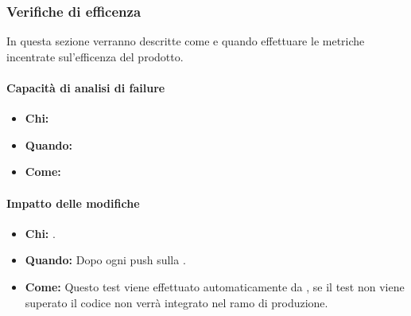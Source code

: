\newpage
\subsubsection{Verifiche di efficenza}
In questa sezione verranno descritte come e quando effettuare le metriche incentrate sul'efficenza del prodotto.

\paragraph{Capacità di analisi di failure}
\begin{itemize}
\item \textbf{Chi:}
\item \textbf{Quando:}
\item \textbf{Come:}
\end{itemize}

\paragraph{Impatto delle modifiche}
\begin{itemize}
\item \textbf{Chi:} .
\item \textbf{Quando:} Dopo ogni push sulla .
\item \textbf{Come:} Questo test viene effettuato automaticamente da , se il test non viene superato il codice non verrà integrato nel ramo di produzione.
\end{itemize}
